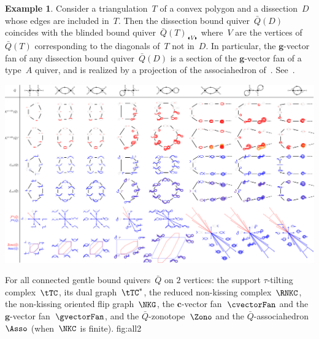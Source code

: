 \documentclass{amsart}
\theoremstyle{definition}
\newtheorem{example}[theorem]{Example}
\renewcommand{\b}[1]{\mathbf{#1}} %
\newcommand{\blinkers}[1]{_{\LEFTCIRCLE \!\! #1 \!\! \RIGHTCIRCLE}} %
\begin{document}
\begin{example}
Consider a triangulation~$T$ of a convex polygon and a dissection~$D$ whose edges are included in~$T$.
Then the dissection bound quiver~$\bar Q(D)$ coincides with the blinded bound quiver~$\bar Q(T)\blinkers{V}$ where~$V$ are the vertices of~$\bar Q(T)$ corresponding to the diagonals of~$T$ not in~$D$.
In particular, the $\b{g}$-vector fan of any dissection bound quiver~$\bar Q(D)$ is a section of the $\b{g}$-vector fan of a type~$A$ quiver, and is realized by a projection of the associahedron of~\cite{HohlwegPilaudStella}.
See~\cite{PilaudPlamondonStella}.
\end{example}


\captionsetup{width=1.5\textwidth}
{\begin{minipage}{23.2cm}\vspace*{-1cm}\includegraphics[scale=.25]{all2}\end{minipage}}
{
For all connected gentle bound quivers~$\bar Q$ on $2$ vertices: the support $\tau$-tilting complex~$\tTC$, its dual graph~$\tTC^*$, the reduced non-kissing complex~$\RNKC$, the non-kissing oriented flip graph~$\NKG$, the $\b{c}$-vector fan~$\cvectorFan$ and the $\b{g}$-vector fan~$\gvectorFan$, and the $\bar Q$-zonotope~$\Zono$ and the $\bar Q$-associahedron~$\Asso$ (when~$\NKC$ is finite).
}
{fig:all2}
\captionsetup{width=\textwidth}
\end{document}
